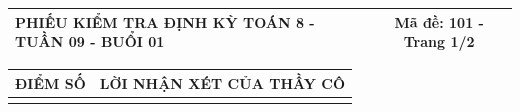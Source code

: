 \documentclass[12pt,a4paper]{article}
\begin{document}
\pagestyle{empty}
\noindent
\begin{tabularx}{\linewidth}{|X|c|}
\hline
\textbf{PHIẾU KIỂM TRA ĐỊNH KỲ TOÁN 8 - TUẦN 09 - BUỔI 01} & \textbf{Mã đề: 101 - Trang 1/2} \\
\hline
\end{tabularx}

\vspace{1.2mm}

\noindent
\begin{tabularx}{\linewidth}{|p{3.2cm}|X|}
\hline
\centering\textbf{ĐIỂM SỐ} & \centering\textbf{LỜI NHẬN XÉT CỦA THẦY CÔ} \tabularnewline
\hline
\rule{0pt}{1.8cm} & \tabularnewline
\hline
\end{tabularx}
\end{document}
